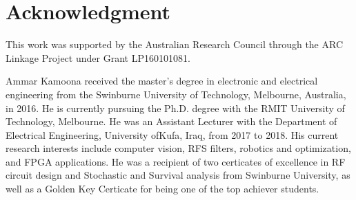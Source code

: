 \documentclass[journal]{IEEEtran}
\begin{document}













\section*{Acknowledgment}
This work was supported by the Australian Research Council through the ARC Linkage Project under Grant LP160101081.


\ifCLASSOPTIONcaptionsoff
  \newpage
\fi











\begin{IEEEbiographynophoto}{Ammar Kamoona}
received the master's degree in electronic and electrical
engineering from the Swinburne University
of Technology, Melbourne, Australia, in 2016.
He is currently pursuing the Ph.D. degree with
the RMIT University of Technology, Melbourne.
He was an Assistant Lecturer with the Department
of Electrical Engineering, University ofKufa, Iraq,
from 2017 to 2018. His current research interests
include computer vision, RFS filters, robotics and
optimization, and FPGA applications. He was a recipient of two certicates
of excellence in RF circuit design and Stochastic and Survival analysis from
Swinburne University, as well as a Golden Key Certicate for being one of
the top achiever students.
\end{IEEEbiographynophoto}
\end{document}
